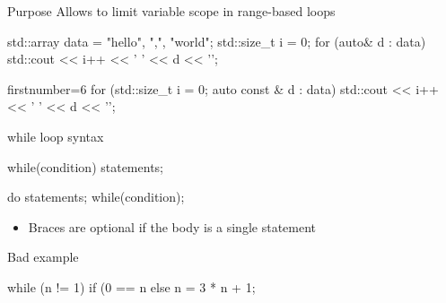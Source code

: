 \begin{frame}[fragile]
  \begin{block}{Purpose}
    Allows to limit variable scope in range-based loops
  \end{block}
  \begin{alertblock}{}
    \begin{cppcode*}{}
      std::array data = {"hello", ",", "world"};
      std::size_t i = 0;
      for (auto& d : data) {
        std::cout << i++ << ' ' << d << '\n';
      }
    \end{cppcode*}
  \end{alertblock}
  \begin{exampleblock}{}
    \begin{cppcode*}{firstnumber=6}
      for (std::size_t i = 0; auto const & d : data) {
        std::cout << i++ << ' ' << d << '\n';
      }
    \end{cppcode*}
  \end{exampleblock}
\end{frame}

\begin{frame}[fragile]
  \begin{block}{while loop syntax}
    \begin{cppcode*}{}
      while(condition) {
        statements;
      }

      do {
        statements;
      } while(condition);
    \end{cppcode*}
    \begin{itemize}
      \item Braces are optional if the body is a single statement
    \end{itemize}
  \end{block}
  \pause
  \begin{alertblock}{Bad example}
    \begin{cppcode*}{}
      while (n != 1)
        if (0 == n%
        else n = 3 * n + 1;
    \end{cppcode*}
  \end{alertblock}
\end{frame}


